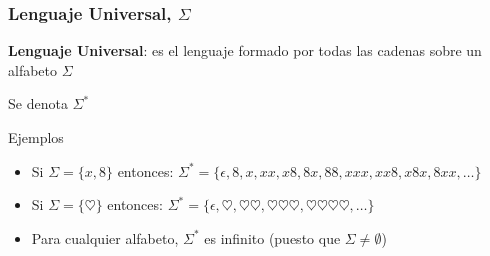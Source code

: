 \begin{frame}
  \frametitle{Lenguaje Universal, $\Sigma$}
      \begin{defi}
			\textbf{Lenguaje Universal}: es el lenguaje formado por todas las cadenas sobre un alfabeto $\Sigma$
			
			Se denota $\Sigma^*$
			\end{defi}

      \pause
      \begin{block}{Ejemplos}
           \begin{itemize}[<+->]
           \item Si $\Sigma = \{x, 8\}$ entonces: $\Sigma^* = \{\epsilon, 8, x, xx, x8, 8x, 88, xxx, xx8, x8x, 8xx, \ldots\}$
           \item Si $\Sigma = \{\heartsuit\}$ entonces: 
					 $\Sigma^* = \{\epsilon, \heartsuit, \heartsuit \heartsuit, \heartsuit \heartsuit \heartsuit, \heartsuit \heartsuit \heartsuit \heartsuit, \ldots\}$
           \item Para cualquier alfabeto, $\Sigma^{*}$  es infinito (puesto que $\Sigma \not = \emptyset$)
           \end{itemize}
			\end{block}
\end{frame}
